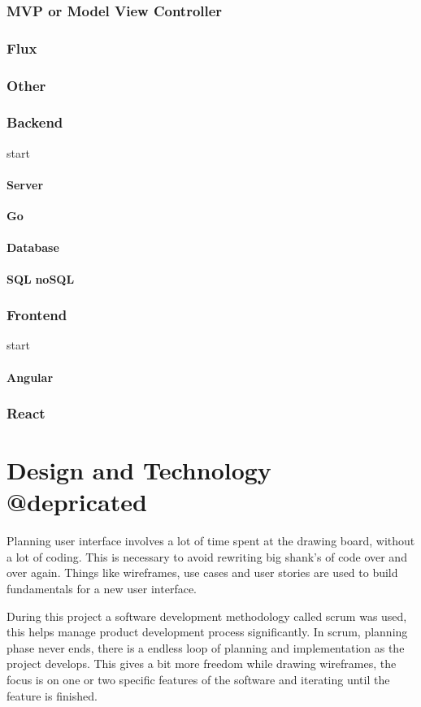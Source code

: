 \subsection{MVP or Model View Controller}\label{sec:mvc}

\subsection{Flux}\label{sec:flux}

\subsection{Other}

\subsection{Backend}
start
\subsubsection{Server}
\textbf{Go}
\subsubsection{Database}
\textbf{SQL}
\textbf{noSQL}
\subsection{Frontend}
start
\subsubsection{Angular}
\subsection{React}

\chapter{Design and Technology @depricated}
Planning user interface involves a lot of time spent at the drawing board, without a lot of coding. This is necessary to avoid rewriting big shank's of code over and over again. Things like wireframes, use cases and user stories are used to build fundamentals for a new user interface.

During this project a software development methodology called scrum was used, this helps manage product development process significantly. In scrum, planning phase never ends, there is a endless loop of planning and implementation as the project develops. This gives a bit more freedom while drawing wireframes, the focus is on one or two specific features of the software and iterating until the feature is finished.\\\\
